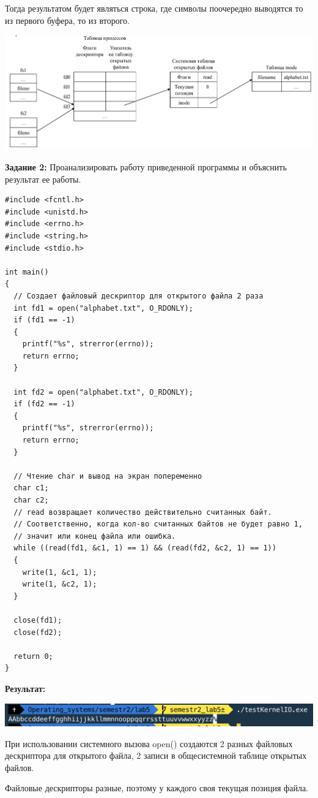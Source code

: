 \documentclass[a4paper,14pt]{extreport} %
\begin{document}
Тогда результатом будет являться строка, где символы поочередно выводятся то из первого буфера, то из второго. 

\includegraphics[scale=0.5]{shema1}

\newpage

\textbf{Задание 2:} Проанализировать работу приведенной программы и объяснить результат ее работы. 

\begin{lstlisting}[]
#include <fcntl.h>
#include <unistd.h>
#include <errno.h>
#include <string.h>
#include <stdio.h>

int main()
{
  // Создает файловый дескриптор для открытого файла 2 раза
  int fd1 = open("alphabet.txt", O_RDONLY);
  if (fd1 == -1)
  {
    printf("%s", strerror(errno));
    return errno;
  }

  int fd2 = open("alphabet.txt", O_RDONLY);
  if (fd2 == -1)
  {
    printf("%s", strerror(errno));
    return errno;
  }

  // Чтение char и вывод на экран попеременно
  char c1;
  char c2;
  // read возвращает количество действительно считанных байт.
  // Соответственно, когда кол-во считанных байтов не будет равно 1,
  // значит или конец файла или ошибка.
  while ((read(fd1, &c1, 1) == 1) && (read(fd2, &c2, 1) == 1))
  {
    write(1, &c1, 1);
    write(1, &c2, 1);
  }

  close(fd1);
  close(fd2);

  return 0;
}
\end{lstlisting}

\textbf{Результат:}

\includegraphics[scale=0.9]{2}

При использовании системного вызова open() создаются 2 разных файловых дескриптора для открытого файла, 2 записи в общесистемной таблице открытых файлов. 

Файловые дескрипторы разные, поэтому у каждого своя текущая позиция файла.
\end{document}
